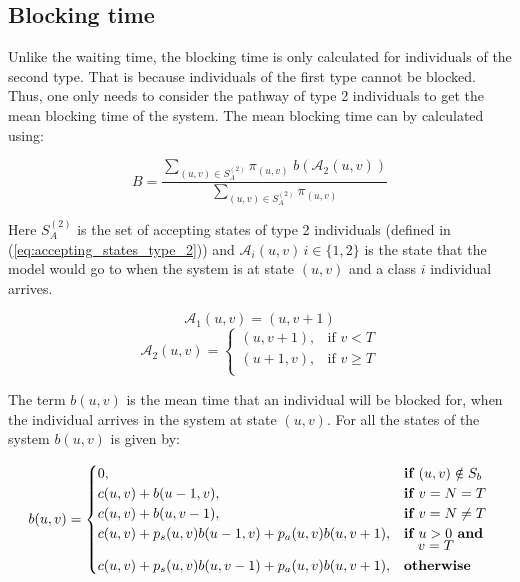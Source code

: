 \subsection{Blocking time}\label{sec:blocking_time}


Unlike the waiting time, the blocking time is only calculated for individuals of
the second type.  
That is because individuals of the first type cannot be blocked. 
Thus, one only needs to consider the pathway of type 2 individuals to get the 
mean blocking time of the system. 
The mean blocking time can by calculated using:

\begin{equation}\label{eq:algebraic_blocking_time}
    B = \frac{\sum_{(u,v) \in S_A^{(2)}} \pi_{(u,v)} \; 
    b(\mathcal{A}_2(u,v))}{\sum_{(u,v) \in S_A^{(2)}} \pi_{(u,v)}}
\end{equation}

Here \(S_A^{(2)}\) is the set of accepting states of type 2 individuals (defined
in (\ref{eq:accepting_states_type_2})) and \(\mathcal{A}_i(u,v) \, i \in 
\{1, 2\} \) is the state that the model would go to when the system is at state 
\( (u,v) \) and a class \(i\) individual arrives. 

\begin{equation}\label{eq:arriving_state_class_1}
    \mathcal{A}_1(u,v) = (u, v + 1)
\end{equation}
\begin{equation}\label{eq:arriving_state_class_2}
    \mathcal{A}_2(u,v) = 
    \begin{cases}
        (u, v + 1), & \text{if } v < T \\
        (u + 1, v), & \text{if } v \geq T \\
    \end{cases}
\end{equation}

The term \(b(u,v)\) is the mean time that an individual will be blocked for, 
when the individual arrives in the system at state \((u,v)\). 
For all the states of the system \(b(u,v)\) is given by:

\begin{equation}\label{eq:general_blocking_time_at_each_state}
    b(u,v) = 
    \begin{cases} 
        0, & \textbf{if } (u,v) \notin S_b \\
        c(u,v) + b(u - 1, v), & \textbf{if } v = N = T\\
        c(u,v) + b(u, v-1), & \textbf{if } v = N \neq T \\
        c(u,v) + p_s(u,v) b(u-1, v) + p_a(u,v) b(u, v+1), & \textbf{if } u > 0 
        \textbf{ and } \vspace{-0.2cm} \\ 
        & \quad v = T \\
        c(u,v) + p_s(u,v) b(u, v-1) + p_a(u,v) b(u, v+1), & \textbf{otherwise} \\
    \end{cases}
\end{equation}

